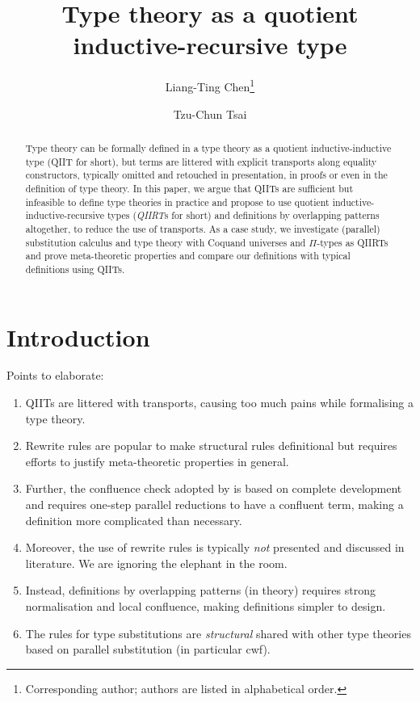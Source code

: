 \documentclass[a4paper,UKenglish,numberwithinsect,cleveref,thm-restate]{lipics-v2021}
\title{Type theory as a quotient inductive-recursive type}
\author{Liang-Ting Chen\footnote{Corresponding author; authors are listed in alphabetical order.}}{Institute of Information Science, Academia Sinica, Taiwan \and \url{http://l-tchen.github.io}}{ltchen@iis.sinica.edu.tw}{https://orcid.org/0000-0002-3250-1331}{[funding]}
\author{Tzu-Chun Tsai}{Institute of Information Science, Academia Sinica, Taiwan}{gene0905@icloud.com}{}{Supported by the National Science and Technology Council of Taiwan under grant NSTC 112-2221-E-001-003-MY3.}
\begin{document}
\maketitle

\begin{abstract}
  Type theory can be formally defined in a type theory as a quotient inductive-inductive type (QIIT for short), but terms are littered with explicit transports along equality constructors, typically omitted and retouched in presentation, in proofs or even in the definition of type theory.
  In this paper, we argue that QIITs are sufficient but infeasible to define type theories in practice and propose to use quotient inductive-inductive-recursive types (\emph{QIIRT}s for short) and definitions by overlapping patterns altogether, to reduce the use of transports.
  As a case study, we investigate (parallel) substitution calculus and type theory with Coquand universes and $\Pi$-types as QIIRTs and prove meta-theoretic properties and compare our definitions with typical definitions using QIITs.
\end{abstract}

\section{Introduction} \label{sec:intro}
Points to elaborate:
\begin{enumerate}
  \item QIITs are littered with transports, causing too much pains while formalising a type theory.
  \item Rewrite rules are popular to make structural rules definitional but requires efforts to justify meta-theoretic properties in general.
  \item Further, the confluence check adopted by \Agda is based on complete development and requires one-step parallel reductions to have a confluent term, making a definition more complicated than necessary.
  \item Moreover, the use of rewrite rules is typically \emph{not} presented and discussed in literature. We are ignoring the elephant in the room.
  \item Instead, definitions by overlapping patterns (in theory) requires strong normalisation and local confluence, making definitions simpler to design.
  \item The rules for type substitutions are \emph{structural} shared with other type theories based on parallel substitution (in particular cwf).
  
\end{enumerate}
\end{document}
